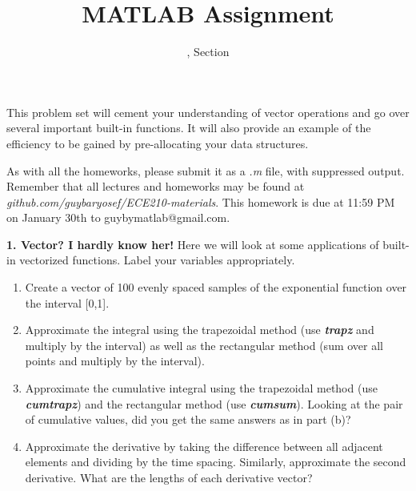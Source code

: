 \documentclass[11pt]{article}
\title{MATLAB Assignment \Homework}
\author{\Session, Section \Section}
\date{}
\makeatletter
\def\MyEmail{guybymatlab@gmail.com}
\def\DateOfSubmission{January 30th }
\newenvironment{qparts}{\begin{enumerate}[{(}a{)}]}{\end{enumerate}}
\makeatother
\begin{document}
\maketitle
This problem set will cement your understanding of vector operations and
go over several important built-in functions.
It will also provide an example of the efficiency to be gained by pre-allocating
your data structures.

As with all the homeworks, please submit it as a \textit{.m} file, 
with suppressed output.
Remember that all lectures and homeworks may be found at 
\textit{github.com/guybaryosef/ECE210-materials}.
This homework is due at 11:59 PM on \DateOfSubmission to \MyEmail. 

\noindent
\newline
\textbf{1. Vector? I hardly know her!}
Here we will look at some applications of built-in vectorized functions.
Label your variables appropriately.
\begin{qparts}
    \item Create a vector of 100 evenly spaced samples of
    the exponential function over the interval [0,1].

    \item Approximate the integral using the trapezoidal method
    (use \textbf{\textit{trapz}} and multiply by the interval)
    as well as the rectangular method (sum over all points and multiply by the interval).

    \item Approximate the cumulative integral using the trapezoidal method
    (use \textbf{\textit{cumtrapz}}) and the rectangular method
    (use \textbf{\textit{cumsum}}).
    Looking at the pair of cumulative values,
    did you get the same answers as in part (b)?

    \item Approximate the derivative by taking the difference between
    all adjacent elements and dividing by the time spacing.
    Similarly, approximate the second derivative.
    What are the lengths of each derivative vector?

\end{qparts}
\end{document}
